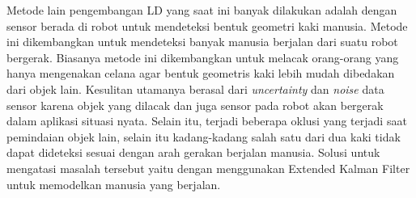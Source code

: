     Metode lain pengembangan LD yang saat ini banyak dilakukan adalah dengan sensor berada di robot untuk mendeteksi bentuk geometri kaki manusia. Metode ini dikembangkan untuk mendeteksi banyak manusia berjalan dari suatu robot bergerak. Biasanya metode ini dikembangkan untuk melacak orang-orang yang hanya mengenakan celana agar bentuk geometris kaki lebih mudah dibedakan dari objek lain.
    Kesulitan utamanya berasal dari \textit{uncertainty} dan \textit{noise} data sensor karena objek yang dilacak dan juga sensor pada robot akan bergerak dalam aplikasi situasi nyata. Selain itu, terjadi beberapa oklusi yang terjadi saat pemindaian objek lain, selain itu kadang-kadang salah satu dari dua kaki tidak dapat dideteksi sesuai dengan arah gerakan berjalan manusia. Solusi untuk mengatasi masalah tersebut yaitu dengan menggunakan Extended Kalman Filter untuk memodelkan manusia yang berjalan.
